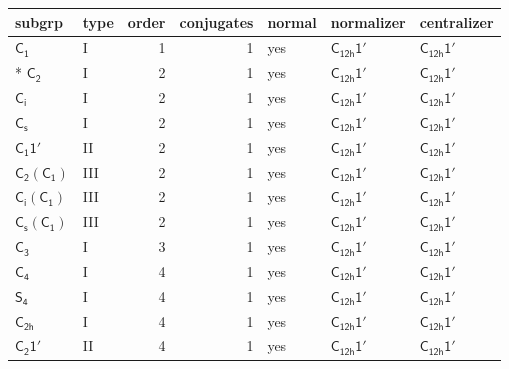 \documentclass[10pt,a4paper]{article}
\numberwithin{equation}{section}
\newcommand{\grp}[1]{\mathsf{#1}}
\begin{document}
{\small\begin{longtable}{@{}llrrlll@{}}\toprule
subgrp & type & order & conjugates & normal & normalizer & centralizer\\\midrule\endhead
\bottomrule\endfoot\endlastfoot
\href{../../../rotation/data/pdf/C1.pdf}{$\grp{C_{1}}$} & I & 1 & 1 & yes & \href{C12h-1p.pdf}{$\grp{C_{12h}1'}$} & \href{C12h-1p.pdf}{$\grp{C_{12h}1'}$}\\*
\href{../../../rotation/data/pdf/C2.pdf}{$\grp{C_{2}}$} & I & 2 & 1 & yes & \href{C12h-1p.pdf}{$\grp{C_{12h}1'}$} & \href{C12h-1p.pdf}{$\grp{C_{12h}1'}$}\\
\href{../../../rotation/data/pdf/S2.pdf}{$\grp{C_{i}}$} & I & 2 & 1 & yes & \href{C12h-1p.pdf}{$\grp{C_{12h}1'}$} & \href{C12h-1p.pdf}{$\grp{C_{12h}1'}$}\\
\href{../../../rotation/data/pdf/C1v.pdf}{$\grp{C_{s}}$} & I & 2 & 1 & yes & \href{C12h-1p.pdf}{$\grp{C_{12h}1'}$} & \href{C12h-1p.pdf}{$\grp{C_{12h}1'}$}\\
\href{C1-1p.pdf}{$\grp{C_{1}1'}$} & II & 2 & 1 & yes & \href{C12h-1p.pdf}{$\grp{C_{12h}1'}$} & \href{C12h-1p.pdf}{$\grp{C_{12h}1'}$}\\
\href{C2-C1.pdf}{$\grp{C_{2}}(\grp{C_{1}})$} & III & 2 & 1 & yes & \href{C12h-1p.pdf}{$\grp{C_{12h}1'}$} & \href{C12h-1p.pdf}{$\grp{C_{12h}1'}$}\\
\href{S2-C1.pdf}{$\grp{C_{i}}(\grp{C_{1}})$} & III & 2 & 1 & yes & \href{C12h-1p.pdf}{$\grp{C_{12h}1'}$} & \href{C12h-1p.pdf}{$\grp{C_{12h}1'}$}\\
\href{C1v-C1.pdf}{$\grp{C_{s}}(\grp{C_{1}})$} & III & 2 & 1 & yes & \href{C12h-1p.pdf}{$\grp{C_{12h}1'}$} & \href{C12h-1p.pdf}{$\grp{C_{12h}1'}$}\\
\href{../../../rotation/data/pdf/C3.pdf}{$\grp{C_{3}}$} & I & 3 & 1 & yes & \href{C12h-1p.pdf}{$\grp{C_{12h}1'}$} & \href{C12h-1p.pdf}{$\grp{C_{12h}1'}$}\\
\href{../../../rotation/data/pdf/C4.pdf}{$\grp{C_{4}}$} & I & 4 & 1 & yes & \href{C12h-1p.pdf}{$\grp{C_{12h}1'}$} & \href{C12h-1p.pdf}{$\grp{C_{12h}1'}$}\\
\href{../../../rotation/data/pdf/S4.pdf}{$\grp{S_{4}}$} & I & 4 & 1 & yes & \href{C12h-1p.pdf}{$\grp{C_{12h}1'}$} & \href{C12h-1p.pdf}{$\grp{C_{12h}1'}$}\\
\href{../../../rotation/data/pdf/C2h.pdf}{$\grp{C_{2h}}$} & I & 4 & 1 & yes & \href{C12h-1p.pdf}{$\grp{C_{12h}1'}$} & \href{C12h-1p.pdf}{$\grp{C_{12h}1'}$}\\
\href{C2-1p.pdf}{$\grp{C_{2}1'}$} & II & 4 & 1 & yes & \href{C12h-1p.pdf}{$\grp{C_{12h}1'}$} & \href{C12h-1p.pdf}{$\grp{C_{12h}1'}$}\\

\end{longtable}}
\end{document}
